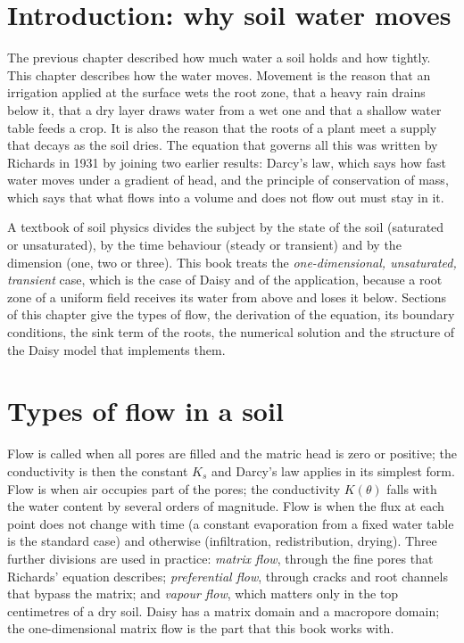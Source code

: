 \section{Introduction: why soil water moves}
The previous chapter described how much water a soil holds and how tightly. This chapter describes how the water moves. Movement is the reason that an irrigation applied at the surface wets the root zone, that a heavy rain drains below it, that a dry layer draws water from a wet one and that a shallow water table feeds a crop. It is also the reason that the roots of a plant meet a supply that decays as the soil dries. The equation that governs all this was written by Richards in 1931 by joining two earlier results: Darcy's law, which says how fast water moves under a gradient of head, and the principle of conservation of mass, which says that what flows into a volume and does not flow out must stay in it.

A textbook of soil physics divides the subject by the state of the soil (saturated or unsaturated), by the time behaviour (steady or transient) and by the dimension (one, two or three). This book treats the \emph{one-dimensional, unsaturated, transient} case, which is the case of Daisy and of the application, because a root zone of a uniform field receives its water from above and loses it below. Sections of this chapter give the types of flow, the derivation of the equation, its boundary conditions, the sink term of the roots, the numerical solution and the structure of the Daisy model that implements them.

\section{Types of flow in a soil}
Flow is called  when all pores are filled and the matric head is zero or positive; the conductivity is then the constant $K_s$ and Darcy's law applies in its simplest form. Flow is  when air occupies part of the pores; the conductivity $K(\theta)$ falls with the water content by several orders of magnitude. Flow is  when the flux at each point does not change with time (a constant evaporation from a fixed water table is the standard case) and  otherwise (infiltration, redistribution, drying). Three further divisions are used in practice: \emph{matrix flow}, through the fine pores that Richards' equation describes; \emph{preferential flow}, through cracks and root channels that bypass the matrix; and \emph{vapour flow}, which matters only in the top centimetres of a dry soil. Daisy has a matrix domain and a macropore domain; the one-dimensional matrix flow is the part that this book works with.

